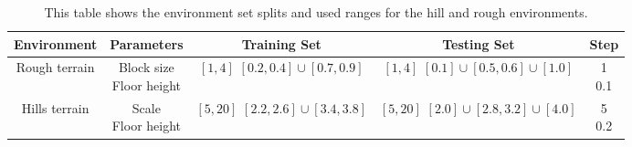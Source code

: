         \begin{table}[ht]
            \centering
            \caption{This table shows the environment set splits and used ranges for the hill and rough environments.}
            \begin{tabular}{|c|c|c|c|c|}
            \hline
            \textbf{Environment} & \textbf{Parameters} & \textbf{Training Set} & \textbf{Testing Set} & \textbf{Step} \\ \hline
                Rough terrain & 
                \makecell{Block size \\ Floor height} & 
                \makecell{$[1, 4]$ \\ $[0.2, 0.4] \cup [0.7, 0.9]$} & 
                \makecell{$[1, 4]$ \\ $[0.1] \cup [0.5, 0.6] \cup [1.0]$} & 
                \makecell{1 \\ 0.1}
            \\ \hline
                Hills terrain &
                \makecell{Scale \\ Floor height} & 
                \makecell{$[5, 20]$ \\ $[2.2, 2.6] \cup [3.4, 3.8]$} & 
                \makecell{$[5, 20]$ \\ $[2.0] \cup [2.8, 3.2] \cup [4.0]$} & 
                \makecell{5 \\ 0.2}
            \\ \hline
        \end{tabular}
        \label{tab:split_table}
        \end{table}